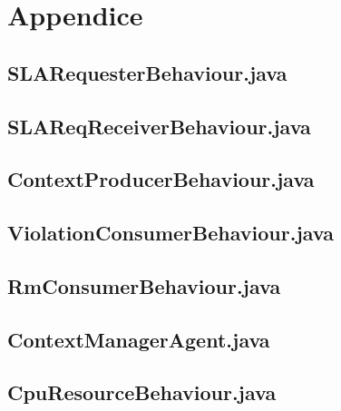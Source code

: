 \chapter{Appendice}\label{appendice}
\section{SLARequesterBehaviour.java}


\section{SLAReqReceiverBehaviour.java}


\section{ContextProducerBehaviour.java}


\section{ViolationConsumerBehaviour.java}


\section{RmConsumerBehaviour.java}


\section{ContextManagerAgent.java}


\section{CpuResourceBehaviour.java}


